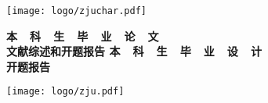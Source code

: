 \cleardoublepage{}

\hskip 40mm

\begin{center}
    \texttt{[image: logo/zjuchar.pdf]}
\end{center}

\begin{center}
     \heiti \bfseries
    {
        本~~科~~生~~毕~~业~~论~~文
        \\ \vskip 24pt
        文献综述和开题报告
    }
    {
        本~~科~~生~~毕~~业~~设~~计
        \\ \vskip 24pt
        开题报告
    }
\end{center}

\vskip 40pt

\begin{center}
    \texttt{[image: logo/zju.pdf]}
\end{center}


